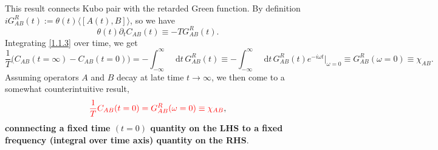 \documentclass[10pt,nofootinbib,letterpaper]{revtex4}
\newcommand*\dd{\mathop{}\!\mathrm{d}}
\begin{document}
			This result connects Kubo pair with the retarded Green function. By definition $iG^R_{AB}(t):=\theta(t)\langle[A(t),B]\rangle$, so we have
			\begin{equation}\label{1.1.3}
				\theta(t)\partial_t C_{AB}(t)\equiv -T G_{AB}^R(t).
			\end{equation}
			Integrating \eqref{1.1.3} over time, we get
			\begin{equation*}
				\dfrac{1}{T}\bigg(C_{AB}(t=\infty)-C_{AB}(t=0)\bigg)=-\int_{-\infty}^\infty\dd t\, G^R_{AB}(t)\equiv-\int_{-\infty}^\infty\dd t\, G^R_{AB}(t)e^{-i\omega t}|_{\omega=0}\equiv G^R_{AB}(\omega=0)\equiv\chi_{AB}.
			\end{equation*}
			Assuming operators $A$ and $B$ decay at late time $t\rightarrow\infty$, we then come to a somewhat counterintuitive result,
			\begin{equation}\label{1.1.4}
				{\color{red}\dfrac{1}{T}C_{AB}(t=0)=G_{AB}^R(\omega=0)\equiv\chi_{AB}},
			\end{equation}
			\textbf{connnecting a fixed time $(t=0)$ quantity on the LHS to a fixed frequency (integral over time axis) quantity on the RHS}.
\end{document}
